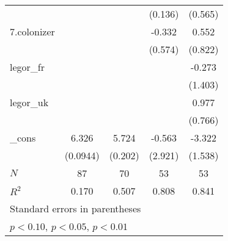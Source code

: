{\begin{tabular}{l*{4}{c}}
            &                     &                     &     (0.136)         &     (0.565)         \\
[1em]
7.colonizer &                     &                     &      -0.332         &       0.552         \\
            &                     &                     &     (0.574)         &     (0.822)         \\
[1em]
legor\_fr    &                     &                     &                     &      -0.273         \\
            &                     &                     &                     &     (1.403)         \\
[1em]
legor\_uk    &                     &                     &                     &       0.977         \\
            &                     &                     &                     &     (0.766)         \\
[1em]
\_cons      &       6.326\sym{***}&       5.724\sym{***}&      -0.563         &      -3.322\sym{*}  \\
            &    (0.0944)         &     (0.202)         &     (2.921)         &     (1.538)         \\
\hline
\(N\)       &          87         &          70         &          53         &          53         \\
\(R^{2}\)   &       0.170         &       0.507         &       0.808         &       0.841         \\
\hline\hline
\multicolumn{5}{l}{\footnotesize Standard errors in parentheses}\\
\multicolumn{5}{l}{\footnotesize \sym{*} \(p<0.10\), \sym{**} \(p<0.05\), \sym{***} \(p<0.01\)}\\
\end{tabular}
}
